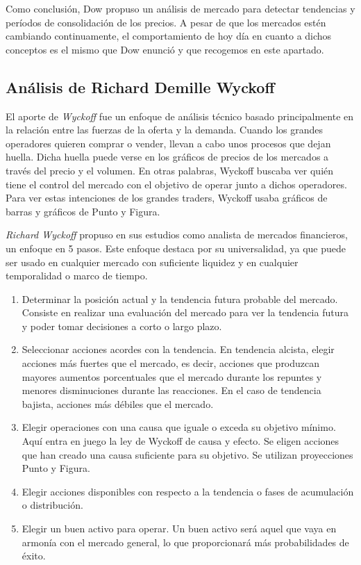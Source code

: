 Como conclusión, Dow propuso un análisis de mercado para detectar tendencias y períodos de consolidación de los precios. A pesar de que los mercados estén cambiando continuamente, el comportamiento de hoy día en cuanto a dichos conceptos es el mismo que Dow enunció y que recogemos en este apartado.


\subsection{Análisis de Richard Demille Wyckoff} \label{wyckoff}

El aporte de \textit{Wyckoff} fue un enfoque de análisis técnico basado principalmente en la relación entre las fuerzas de la oferta y la demanda. Cuando los grandes operadores quieren comprar o vender, llevan a cabo unos procesos que dejan huella. Dicha huella puede verse en los gráficos de precios de los mercados a través del precio y el volumen. En otras palabras, Wyckoff buscaba ver quién tiene el control del mercado con el objetivo de operar junto a dichos operadores. Para ver estas intenciones de los grandes traders, Wyckoff usaba gráficos de barras y gráficos de Punto y Figura. \newline

\textit{Richard Wyckoff} propuso en sus estudios como analista de mercados financieros, un enfoque en 5 pasos. Este enfoque destaca por su universalidad, ya que puede ser usado en cualquier mercado con suficiente liquidez y en cualquier temporalidad o marco de tiempo. \newline

\begin{enumerate}
	\item Determinar la posición actual y la tendencia futura probable del mercado. Consiste en realizar una evaluación del mercado para ver la tendencia futura y poder tomar decisiones a corto o largo plazo.
	\item Seleccionar acciones acordes con la tendencia. En tendencia alcista, elegir acciones más fuertes que el mercado, es decir, acciones que produzcan mayores aumentos porcentuales que el mercado durante los repuntes y menores disminuciones durante las reacciones. En el caso de tendencia bajista, acciones más débiles que el mercado.
	\item Elegir operaciones con una causa que iguale o exceda su objetivo mínimo. Aquí entra en juego la ley de Wyckoff de causa y efecto. Se eligen acciones que han creado una causa suficiente para su objetivo. Se utilizan proyecciones Punto y Figura.
	\item Elegir acciones disponibles con respecto a la tendencia o fases de acumulación o distribución.
	\item Elegir un buen activo para operar. Un buen activo será aquel que vaya en armonía con el mercado general, lo que proporcionará más probabilidades de éxito.
\end{enumerate}

